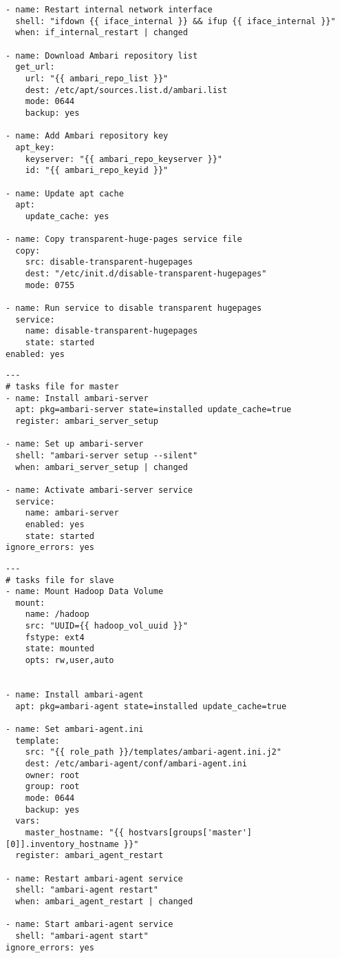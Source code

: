 \begin{lstlisting}[caption={Common tasks in Ansible}, label={lst:ansiblecommon}]
- name: Restart internal network interface
  shell: "ifdown {{ iface_internal }} && ifup {{ iface_internal }}"
  when: if_internal_restart | changed

- name: Download Ambari repository list
  get_url:
    url: "{{ ambari_repo_list }}"
    dest: /etc/apt/sources.list.d/ambari.list
    mode: 0644
    backup: yes

- name: Add Ambari repository key
  apt_key:
    keyserver: "{{ ambari_repo_keyserver }}"
    id: "{{ ambari_repo_keyid }}"

- name: Update apt cache
  apt:
    update_cache: yes

- name: Copy transparent-huge-pages service file
  copy:
    src: disable-transparent-hugepages
    dest: "/etc/init.d/disable-transparent-hugepages"
    mode: 0755

- name: Run service to disable transparent hugepages
  service:
    name: disable-transparent-hugepages
    state: started
enabled: yes
\end{lstlisting}


\lstset{language=sh}
\begin{lstlisting}[caption={Tasks for the master role in Ansible}, label={lst:ansiblemaster}]
---
# tasks file for master
- name: Install ambari-server
  apt: pkg=ambari-server state=installed update_cache=true
  register: ambari_server_setup

- name: Set up ambari-server
  shell: "ambari-server setup --silent"
  when: ambari_server_setup | changed

- name: Activate ambari-server service
  service:
    name: ambari-server
    enabled: yes
    state: started
ignore_errors: yes
\end{lstlisting}

\lstset{language=sh}
\begin{lstlisting}[caption={Tasks for the slave role in Ansible}, label={lst:ansibleslave}]
---
# tasks file for slave
- name: Mount Hadoop Data Volume
  mount:
    name: /hadoop
    src: "UUID={{ hadoop_vol_uuid }}"
    fstype: ext4
    state: mounted
    opts: rw,user,auto


- name: Install ambari-agent
  apt: pkg=ambari-agent state=installed update_cache=true

- name: Set ambari-agent.ini
  template:
    src: "{{ role_path }}/templates/ambari-agent.ini.j2"
    dest: /etc/ambari-agent/conf/ambari-agent.ini
    owner: root
    group: root
    mode: 0644
    backup: yes
  vars:
    master_hostname: "{{ hostvars[groups['master'][0]].inventory_hostname }}"
  register: ambari_agent_restart

- name: Restart ambari-agent service
  shell: "ambari-agent restart"
  when: ambari_agent_restart | changed

- name: Start ambari-agent service
  shell: "ambari-agent start"
ignore_errors: yes
\end{lstlisting}